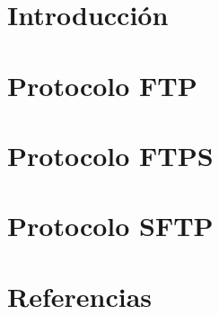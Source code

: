 \section{Introducci\'on}
  
\section{Protocolo FTP}

\section{Protocolo FTPS}

\section{Protocolo SFTP}

\section{Referencias}
